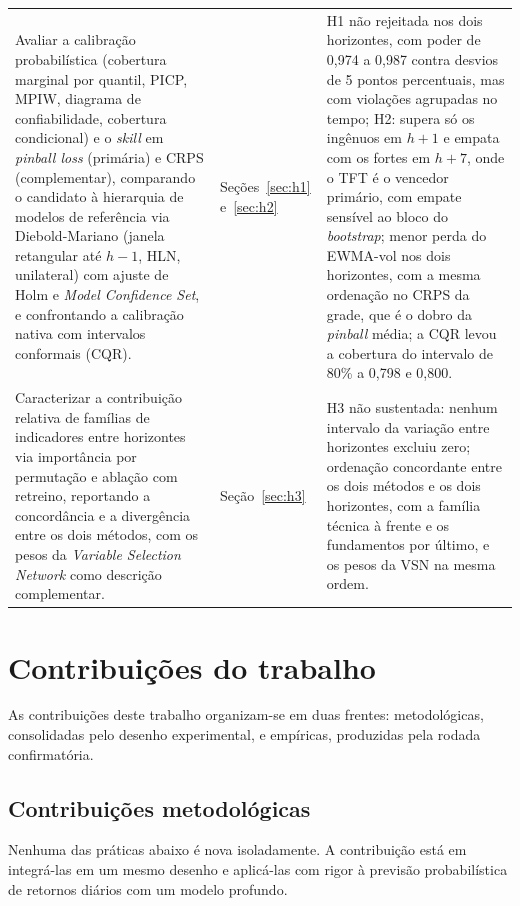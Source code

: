 \begin{table}[htbp]
\begin{tabular}{>{\raggedright\arraybackslash}p{5.6cm} >{\raggedright\arraybackslash}p{2.3cm} >{\raggedright\arraybackslash}p{6.4cm}}
Avaliar a calibração probabilística (cobertura marginal por quantil, PICP, MPIW, diagrama de confiabilidade, cobertura condicional) e o \textit{skill} em \textit{pinball loss} (primária) e CRPS (complementar), comparando o candidato à hierarquia de modelos de referência via Diebold-Mariano (janela retangular até \(h-1\), HLN, unilateral) com ajuste de Holm e \textit{Model Confidence Set}, e confrontando a calibração nativa com intervalos conformais (CQR). & Seções~\ref{sec:h1} e~\ref{sec:h2} & H1 não rejeitada nos dois horizontes, com poder de 0,974 a 0,987 contra desvios de 5 pontos percentuais, mas com violações agrupadas no tempo; H2: supera só os ingênuos em \(h+1\) e empata com os fortes em \(h+7\), onde o TFT é o vencedor primário, com empate sensível ao bloco do \textit{bootstrap}; menor perda do EWMA-vol nos dois horizontes, com a mesma ordenação no CRPS da grade, que é o dobro da \textit{pinball} média; a CQR levou a cobertura do intervalo de 80\% a 0,798 e 0,800. \\
\addlinespace
Caracterizar a contribuição relativa de famílias de indicadores entre horizontes via importância por permutação e ablação com retreino, reportando a concordância e a divergência entre os dois métodos, com os pesos da \textit{Variable Selection Network} como descrição complementar. & Seção~\ref{sec:h3} & H3 não sustentada: nenhum intervalo da variação entre horizontes excluiu zero; ordenação concordante entre os dois métodos e os dois horizontes, com a família técnica à frente e os fundamentos por último, e os pesos da VSN na mesma ordem. \\
\bottomrule
\end{tabular}
\end{table}

\section{Contribuições do trabalho}
As contribuições deste trabalho organizam-se em duas frentes: metodológicas, consolidadas pelo desenho experimental, e empíricas, produzidas pela rodada confirmatória.

\subsection{Contribuições metodológicas}
Nenhuma das práticas abaixo é nova isoladamente. A contribuição está em integrá-las em um mesmo desenho e aplicá-las com rigor à previsão probabilística de retornos diários com um modelo profundo.

